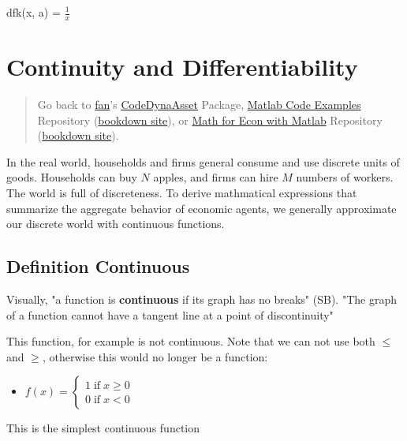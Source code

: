\documentclass[
]{book}
\providecommand{\tightlist}{%
  \setlength{\itemsep}{0pt}\setlength{\parskip}{0pt}}
\begin{document}
dfk(x, a) = \(\displaystyle \frac{1}{x}\)

\hypertarget{continuity-and-differentiability}{%
\section{Continuity and Differentiability}\label{continuity-and-differentiability}}

\begin{quote}
Go back to \href{http://fanwangecon.github.io/}{fan}'s \href{https://fanwangecon.github.io/CodeDynaAsset/}{CodeDynaAsset} Package, \href{https://fanwangecon.github.io/M4Econ/}{Matlab Code Examples} Repository (\href{https://fanwangecon.github.io/M4Econ/bookdown}{bookdown site}), or \href{https://fanwangecon.github.io/Math4Econ/}{Math for Econ with Matlab} Repository (\href{https://fanwangecon.github.io/Math4Econ/bookdown}{bookdown site}).
\end{quote}

In the real world, households and firms general consume and use discrete
units of goods. Households can buy \(N\) apples, and firms can hire \(M\)
numbers of workers. The world is full of discreteness. To derive
mathmatical expressions that summarize the aggregate behavior of
economic agents, we generally approximate our discrete world with
continuous functions.

\hypertarget{definition-continuous}{%
\subsection{Definition Continuous}\label{definition-continuous}}

Visually, "a function is \textbf{continuous} if its graph has no breaks"
(SB). "The graph of a function cannot have a tangent line at a point of
discontinuity"

This function, for example is not continuous. Note that we can not use
both \(\le\) and \(\ge\), otherwise this would no longer be a function:

\begin{itemize}
\tightlist
\item
  \(\displaystyle f(x)=\left\lbrace \begin{array}{c} 1\;\textrm{if}\;x\ge 0\\ 0\;\textrm{if}\;x<0 \end{array}\right.\)
\end{itemize}

This is the simplest continuous function
\end{document}
